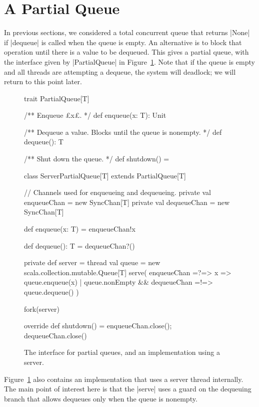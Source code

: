 \section{A Partial Queue}
\label{sec:partial-queue}

In previous sections, we considered a total concurrent queue that returns
|None| if |dequeue| is called when the queue is empty.  
%
An alternative is to block that operation until there is a value to be
dequeued.  This gives a partial queue, with the interface given by
|PartialQueue| in Figure~\ref{fig:partial-queue}.  Note
that if the queue is empty and all threads are attempting a dequeue, the
system will deadlock; we will return to this point later.


\begin{figure}
\begin{scala}
trait PartialQueue[T]{
  /** Enqueue £x£. */
  def enqueue(x: T): Unit

  /** Dequeue a value.  Blocks until the queue is nonempty. */
  def dequeue(): T

  /** Shut down the queue. */
  def shutdown() = {}
}

class ServerPartialQueue[T] extends PartialQueue[T]{
  // Channels used for enqueueing and dequeueing.
  private val enqueueChan = new SyncChan[T]
  private val dequeueChan = new SyncChan[T]

  def enqueue(x: T) = enqueueChan!x

  def dequeue(): T = dequeueChan?()

  private def server = thread{
    val queue = new scala.collection.mutable.Queue[T]
    serve(
      enqueueChan =?=> { x => queue.enqueue(x) }
      | queue.nonEmpty && dequeueChan =!=> queue.dequeue()
    )
  }

  fork(server)

  override def shutdown() = { enqueueChan.close(); dequeueChan.close() }
}
\end{scala}
\caption{The interface for partial queues, and an implementation using a
  server.}
\label{fig:partial-queue}
\end{figure}


Figure~\ref{fig:partial-queue} also contains an implementation that uses a
server thread internally.  The main point of interest here is that the |serve|
uses a guard on the dequeuing branch that allows dequeues only when the queue
is nonempty. 

